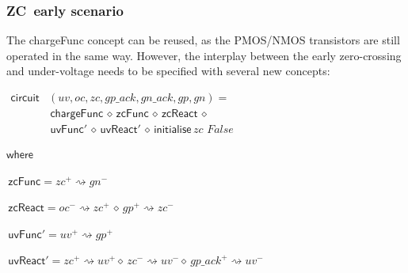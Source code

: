 \documentclass[british,compsoc]{IEEEtran}
\begin{document}
\subsubsection{ZC~early scenario}

The \textsf{chargeFunc} concept can be reused, as the PMOS/NMOS transistors
are still operated in the same way. However, the interplay between
the early zero-crossing and under-voltage needs to be specified with
several new concepts:

\begin{onehalfspace}
\begin{minipage}[t]{1\columnwidth}%

\begin{flushleft}
$\begin{aligned}\mathsf{circuit}&(uv, oc, zc, gp\_ack, gn\_ack, gp, gn)= \\ &\,\mathsf{chargeFunc}\,\diamond\,\mathsf{zcFunc}\,\diamond\,\mathsf{zcReact}\,\diamond\\
& \,\mathsf{uvFunc'}\,\diamond\,\mathsf{uvReact'}\,\diamond\,\mathsf{initialise}\,zc\,\,False
\end{aligned}
$
\par\end{flushleft}%

\begin{flushleft}
$\mathsf{where}$
\end{flushleft}

\begin{flushleft}
$\,\mathsf{zcFunc}=zc^{+}\rightsquigarrow gn^{-}$
\par\end{flushleft}

\begin{flushleft}
$\,\mathsf{zcReact}=oc^{-}\rightsquigarrow zc^{+}\,\diamond\, gp^{+}\rightsquigarrow zc^{-}$
\par\end{flushleft}

\begin{flushleft}
$\,\mathsf{uvFunc'}=uv^{+}\rightsquigarrow gp^{+}$
\par\end{flushleft}

\begin{flushleft}
$\,\mathsf{uvReact'}=zc^{+}\rightsquigarrow uv^{+}\diamond\, zc^{-}\rightsquigarrow uv^{-}\diamond\, gp\_ack^{+}\rightsquigarrow uv^{-}$
\par\end{flushleft}

\end{minipage}
\end{onehalfspace}
\end{document}
